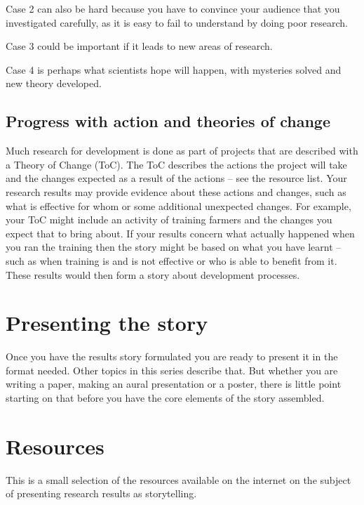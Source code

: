 \documentclass[
  titlepage]{book}
\begin{document}
Case 2 can also be hard because you have to convince your audience that you investigated carefully, as it is easy to fail to understand by doing poor research.

Case 3 could be important if it leads to new areas of research.

Case 4 is perhaps what scientists hope will happen, with mysteries solved and new theory developed.

\hypertarget{progress-with-action-and-theories-of-change}{%
\subsection{Progress with action and theories of change}\label{progress-with-action-and-theories-of-change}}

Much research for development is done as part of projects that are described with a Theory of Change (ToC). The ToC describes the actions the project will take and the changes expected as a result of the actions -- see the resource list. Your research results may provide evidence about these actions and changes, such as what is effective for whom or some additional unexpected changes. For example, your ToC might include an activity of training farmers and the changes you expect that to bring about. If your results concern what actually happened when you ran the training then the story might be based on what you have learnt --such as when training is and is not effective or who is able to benefit from it. These results would then form a story about development processes.

\hypertarget{presenting-the-story}{%
\section{Presenting the story}\label{presenting-the-story}}

Once you have the results story formulated you are ready to present it in the format needed. Other topics in this series describe that. But whether you are writing a paper, making an aural presentation or a poster, there is little point starting on that before you have the core elements of the story assembled.

\hypertarget{resources}{%
\section{Resources}\label{resources}}

This is a small selection of the resources available on the internet on the subject of presenting research results as storytelling.
\end{document}
